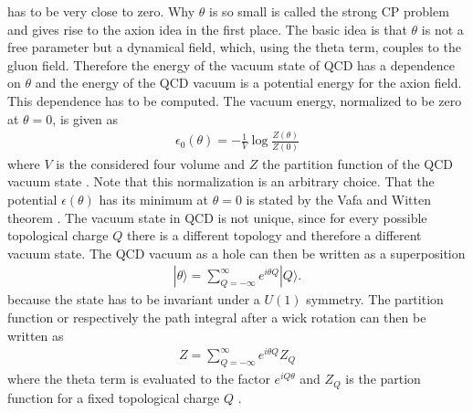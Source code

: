 \documentclass[a4paper, 12pt]{article}
\begin{document}
has to be very close to zero. Why $\theta$ is so small is called the strong CP problem and gives rise to the axion idea in the first place. The basic idea is that $\theta$ is not a free parameter
but a dynamical field, which, using the theta term, couples to the gluon field. Therefore
the energy of the vacuum state of QCD has a dependence on $\theta$ and the energy of the QCD vacuum
is a potential energy for the axion field. This dependence has to be computed.
The vacuum energy, normalized to be zero at $\theta = 0$, is given as
\begin{align*}
   \epsilon_0(\theta) = - \frac{1}{V} \log \frac{Z(\theta)}{Z(0)}
\end{align*}
where $V$ is the considered four volume and $Z$ the partition function of the QCD vacuum state
\cite[Eq. 2.2]{FiniteTempQCD}.
Note that this normalization is an arbitrary choice.
That the potential $\epsilon(\theta)$ has its minimum at $\theta = 0$ is stated by the Vafa and Witten theorem \cite{VafaWitten}.
The vacuum state in QCD is not unique, since for every possible topological charge $Q$
there is a different topology and therefore a different vacuum state.
The QCD vacuum as a hole can then be written as a superposition
\begin{align*}
    |\theta \rangle  = \sum_{Q = - \infty}^{\infty} e^{i \theta Q} |Q \rangle.
\end{align*}
because the state has to be invariant under a $U(1)$ symmetry. %
The partition function or respectively the path integral after a wick rotation can then be written as
\begin{align*}
    Z = \sum_{Q = - \infty}^\infty e^{i \theta Q}Z_Q
\end{align*}
where the theta term is evaluated to the factor $e^{i Q \theta}$  and
$Z_Q$ is the partion function for a fixed topological charge $Q$ \cite[Sec. II, Eq. 2.7]{Leutwyler:1992yt}.
\end{document}

